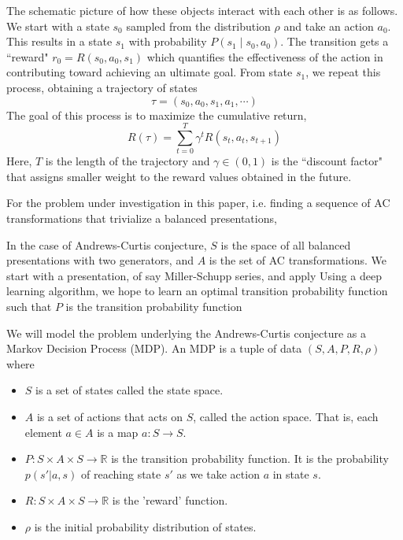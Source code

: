 The schematic picture of how these objects interact with each other is as follows. We start with a state $s_0$ sampled from the distribution $\rho$ and take an action $a_0$. This results in a state $s_1$ with probability $P(s_1 \mid s_0, a_0) $. The transition gets a ``reward" $r_0 = R(s_0, a_0, s_1)$ which quantifies the effectiveness of the action in contributing toward achieving an ultimate goal. From state $s_1$, we repeat this process, obtaining a trajectory of states
\[
\tau = \left( s_0, a_0, s_1, a_1, \cdots \right)
\]
The goal of this process is to maximize the cumulative return,
\[
R(\tau) = \sum\limits_{t=0}^{T} \gamma^t R(s_t, a_t, s_{t+1})
\]
Here, $T$ is the length of the trajectory and $\gamma \in \left(0, 1 \right)$ is the ``discount factor" that assigns smaller weight to the reward values obtained in the future. 
\newline

For the problem under investigation in this paper, i.e. finding a sequence of AC transformations that trivialize a balanced presentations, 


In the case of Andrews-Curtis conjecture, $S$ is the space of all balanced presentations with two generators, and $A$ is the set of AC transformations. We start with a presentation, of say Miller-Schupp series, and apply  Using a deep learning algorithm, we hope to learn an optimal transition probability function such that 
$P$ is the transition probability function 

We will model the problem underlying the Andrews-Curtis conjecture as a Markov Decision Process (MDP).
An MDP is a tuple of data $(S, A, P, R, \rho)$ where
\begin{itemize}
	\item $S$ is a set of states called the state space.
	\item $A$ is a set of actions that acts on $S$, called the action space.
	That is, each element $a \in A$ is a map $a \colon S \to S$.
	\item $P \colon S \times A \times S \to \mathbb{R}$ is the transition
	probability function.
	It is the probability $p (s' | a, s)$ of reaching
	state $s'$ as we take action $a$ in state $s$.
	\item $R \colon S \times A \times S \to \mathbb{R}$ is the 'reward' function.
	\item $\rho$ is the initial probability distribution of states.
\end{itemize}

